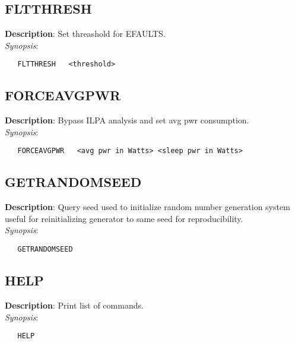 \subsection{\bf FLTTHRESH}
\label{manpages:FLTTHRESH}
\label{manpages:fltthresh}
\vspace{-0.2in}
{\bf Description}: 	Set threashold for EFAULTS.\\[1.5ex]
{\em Synopsis}:
\vspace{-0.2in}
\scriptsize
\begin{verbatim}
   FLTTHRESH   <threshold>					
\end{verbatim}
\normalsize
\vspace{-0.2in}


\subsection{\bf FORCEAVGPWR}
\label{manpages:FORCEAVGPWR}
\label{manpages:forceavgpwr}
\vspace{-0.2in}
{\bf Description}: 	Bypass ILPA analysis and set avg pwr consumption.\\[1.5ex]
{\em Synopsis}:
\vspace{-0.2in}
\scriptsize
\begin{verbatim}
   FORCEAVGPWR   <avg pwr in Watts> <sleep pwr in Watts>	
\end{verbatim}
\normalsize
\vspace{-0.2in}


\subsection{\bf GETRANDOMSEED}
\label{manpages:GETRANDOMSEED}
\label{manpages:getrandomseed}
\vspace{-0.2in}
{\bf Description}: 	Query seed used to initialize random number generation system useful for reinitializing generator to same seed for reproducibility.\\[1.5ex]
{\em Synopsis}:
\vspace{-0.2in}
\scriptsize
\begin{verbatim}
   GETRANDOMSEED   	
\end{verbatim}
\normalsize
\vspace{-0.2in}


\subsection{\bf HELP}
\label{manpages:HELP}
\label{manpages:help}
\vspace{-0.2in}
{\bf Description}: 	Print list of commands.\\[1.5ex]
{\em Synopsis}:
\vspace{-0.2in}
\scriptsize
\begin{verbatim}
   HELP   						
\end{verbatim}
\normalsize
\vspace{-0.2in}


